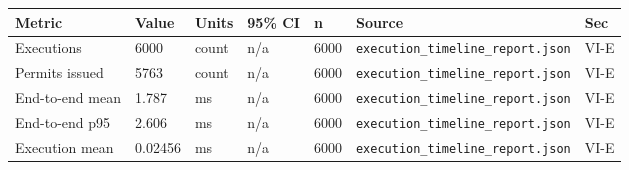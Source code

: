 \begin{tabular}{lllllll}
\hline
Metric & Value & Units & 95\% CI & n & Source & Sec \\
\hline
Executions & 6000 & count & n/a & 6000 & \texttt{execution_timeline_report.json} & VI-E \\
Permits issued & 5763 & count & n/a & 6000 & \texttt{execution_timeline_report.json} & VI-E \\
End-to-end mean & 1.787 & ms & n/a & 6000 & \texttt{execution_timeline_report.json} & VI-E \\
End-to-end p95 & 2.606 & ms & n/a & 6000 & \texttt{execution_timeline_report.json} & VI-E \\
Execution mean & 0.02456 & ms & n/a & 6000 & \texttt{execution_timeline_report.json} & VI-E \\
\hline
\end{tabular}
